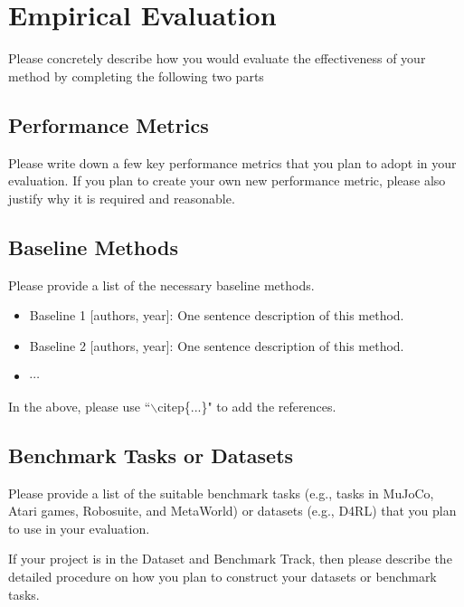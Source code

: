 \section{Empirical Evaluation}
\label{section:evaluation}
Please concretely describe how you would evaluate the effectiveness of your method by completing the following two parts

\subsection{Performance Metrics}
Please write down a few key performance metrics that you plan to adopt in your evaluation.
If you plan to create your own new performance metric, please also justify why it is required and reasonable.

\subsection{Baseline Methods}
Please provide a list of the necessary baseline methods. 
\begin{itemize}
    \item Baseline 1 [authors, year]: One sentence description of this method.
    \item Baseline 2 [authors, year]: One sentence description of this method.
    \item $\cdots$
\end{itemize}
In the above, please use ``$\backslash$citep\{...\}" to add the references.

\subsection{Benchmark Tasks or Datasets}
Please provide a list of the suitable benchmark tasks (e.g., tasks in MuJoCo, Atari games, Robosuite, and MetaWorld) or datasets (e.g., D4RL) that you plan to use in your evaluation.

If your project is in the Dataset and Benchmark Track, then please describe the detailed procedure on how you plan to construct your datasets or benchmark tasks.

